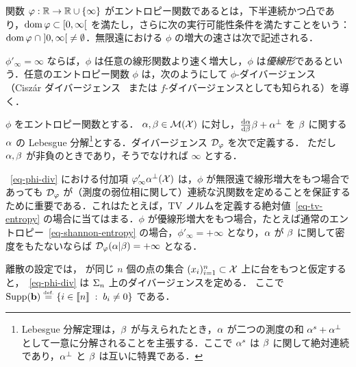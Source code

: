 \begin{defn}[エントロピー関数]
\label{def_entropy}
関数 $\varphi : \mathbb{R} \to \mathbb{R} \cup \{\infty\}$ がエントロピー関数であるとは，下半連続かつ凸であり，$\operatorname{dom} \varphi\subset [0,\infty[$ を満たし，さらに次の実行可能性条件を満たすことをいう：$\operatorname{dom} \varphi \; \cap\;  ]0, \infty[\; \neq \emptyset$．無限遠における $\phi$ の増大の速さは次で記述される．%
\end{defn}

$\phi'_\infty = \infty$ ならば，$\phi$ は任意の線形関数より速く増大し，$\phi$ は\emph{優線形}であるという．任意のエントロピー関数 $\phi$ は，次のようにして $\phi$-ダイバージェンス（Cisz\'ar ダイバージェンス~\citep{ciszar1967information,ali1966general} または $f$-ダイバージェンスとしても知られる）を導く．



\begin{defn}
\label{def_divergence}
$\phi$ をエントロピー関数とする．
$\alpha,\beta \in \mathcal{M}(\mathcal{X})$ に対し，$\frac{\mathrm{d} \alpha}{\mathrm{d} \beta} \beta + \alpha^{\perp}$ を $\beta$ に関する $\alpha$ の Lebesgue 分解\footnote{Lebesgue 分解定理は，$\beta$ が与えられたとき，$\alpha$ が二つの測度の和 $\alpha^s + \alpha^\perp$ として一意に分解されることを主張する．ここで $\alpha^s$ は $\beta$ に関して絶対連続であり，$\alpha^\perp$ と $\beta$ は互いに特異である．}とする．ダイバージェンス $\mathcal{D}_\varphi$ を次で定義する．
ただし $\alpha,\beta$ が非負のときであり，そうでなければ $\infty$ とする．
\end{defn}%

~\eqref{eq-phi-div} における付加項 $\varphi'_\infty \alpha^{\perp}(\mathcal{X})$ は，$\phi$ が無限遠で線形増大をもつ場合であっても $\mathcal{D}_\varphi$ が（測度の弱位相に関して）連続な汎関数を定めることを保証するために重要である．これはたとえば，TV ノルムを定義する絶対値~\eqref{eq-tv-entropy} の場合に当てはまる．$\phi$ が優線形増大をもつ場合，たとえば通常のエントロピー~\eqref{eq-shannon-entropy} の場合，$\phi'_\infty=+\infty$ となり，$\alpha$ が $\beta$ に関して密度をもたないならば $\mathcal{D}_\varphi (\alpha|\beta) = +\infty$ となる．

離散の設定では，
が同じ $n$ 個の点の集合 $(x_i)_{i=1}^n \subset \mathcal{X}$ 上に台をもつと仮定すると，~\eqref{eq-phi-div} は $\Sigma_n$ 上のダイバージェンスを定める．
ここで $\operatorname{Supp}(\mathrm{\textbf{b}}) \stackrel{\mbox{\upshape\tiny def.}}{=} \left\{ i \in \llbracket n\rrbracket \;:\;  b_i \neq 0  \right\}$ である．

